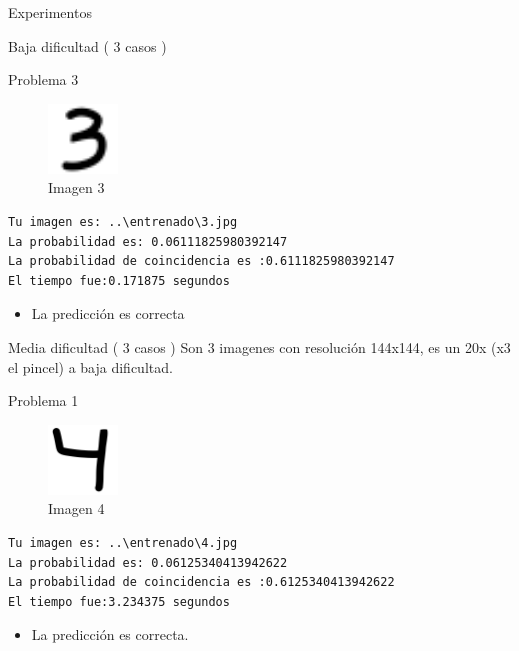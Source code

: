 \documentclass[
  spanish,
  ignorenonframetext,
]{beamer}
\providecommand{\tightlist}{%
  \setlength{\itemsep}{0pt}\setlength{\parskip}{0pt}}
\begin{document}
\begin{frame}[fragile]{Experimentos}
\begin{block}{Baja dificultad ( 3 casos )}
\begin{block}{Problema 3}
\protect\hypertarget{problema-3}{}
\begin{figure}
\centering
\includegraphics[width=0.72917in,height=\textheight]{documentacion/img/3.png}
\caption{Imagen 3}
\end{figure}

\begin{verbatim}
Tu imagen es: ..\entrenado\3.jpg
La probabilidad es: 0.06111825980392147
La probabilidad de coincidencia es :0.6111825980392147
El tiempo fue:0.171875 segundos
\end{verbatim}

\begin{itemize}
\tightlist
\item
  La predicción es correcta
\end{itemize}
\end{block}
\end{block}

\begin{block}{Media dificultad ( 3 casos )}
\protect\hypertarget{media-dificultad-3-casos}{}
Son 3 imagenes con resolución 144x144, es un 20x (x3 el pincel) a baja
dificultad.

\begin{block}{Problema 1}
\protect\hypertarget{problema-1-1}{}
\begin{figure}
\centering
\includegraphics[width=0.72917in,height=\textheight]{documentacion/img/4.png}
\caption{Imagen 4}
\end{figure}

\begin{verbatim}
Tu imagen es: ..\entrenado\4.jpg
La probabilidad es: 0.06125340413942622
La probabilidad de coincidencia es :0.6125340413942622
El tiempo fue:3.234375 segundos
\end{verbatim}

\begin{itemize}
\tightlist
\item
  La predicción es correcta.
\end{itemize}
\end{block}


\end{block}
\end{frame}
\end{document}
